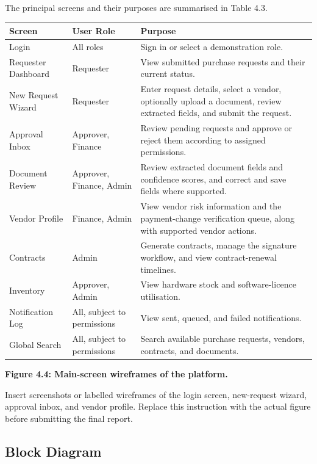 \documentclass[12pt,a4paper]{report}
\begin{document}
The principal screens and their purposes are summarised in
Table 4.3.

\begin{longtable}{|p{1.35in}|p{1.35in}|p{3in}|}
\hline
\textbf{Screen} & \textbf{User Role} & \textbf{Purpose} \\
\hline
Login & All roles & Sign in or select a demonstration role. \\
\hline
Requester Dashboard & Requester & View submitted purchase requests and their current status. \\
\hline
New Request Wizard & Requester & Enter request details, select a vendor, optionally upload a document, review extracted fields, and submit the request. \\
\hline
Approval Inbox & Approver, Finance & Review pending requests and approve or reject them according to assigned permissions. \\
\hline
Document Review & Approver, Finance, Admin & Review extracted document fields and confidence scores, and correct and save fields where supported. \\
\hline
Vendor Profile & Finance, Admin & View vendor risk information and the payment-change verification queue, along with supported vendor actions. \\
\hline
Contracts & Admin & Generate contracts, manage the signature workflow, and view contract-renewal timelines. \\
\hline
Inventory & Approver, Admin & View hardware stock and software-licence utilisation. \\
\hline
Notification Log & All, subject to permissions & View sent, queued, and failed notifications. \\
\hline
Global Search & All, subject to permissions & Search available purchase requests, vendors, contracts, and documents. \\
\hline
\end{longtable}

\textbf{Figure 4.4: Main-screen wireframes of the platform.}

Insert screenshots or labelled wireframes of the login screen,
new-request wizard, approval inbox, and vendor profile. Replace
this instruction with the actual figure before submitting the
final report.

\subsection{Block Diagram}
\end{document}
